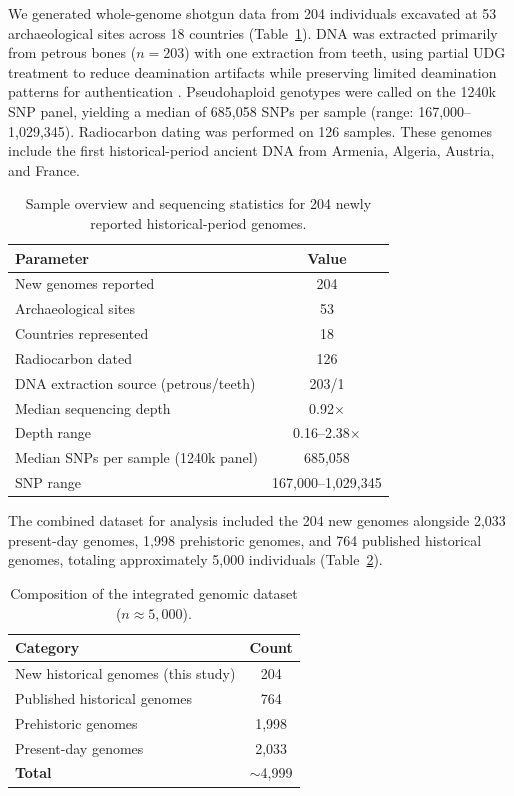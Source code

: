 \documentclass[11pt]{article}
\begin{document}
We generated whole-genome shotgun data from 204 individuals excavated at 53 archaeological sites across 18 countries (Table~\ref{tab:sample_overview}). DNA was extracted primarily from petrous bones ($n = 203$) with one extraction from teeth, using partial UDG treatment to reduce deamination artifacts while preserving limited deamination patterns for authentication \citep{rohland2015partial}. Pseudohaploid genotypes were called on the 1240k SNP panel, yielding a median of 685,058 SNPs per sample (range: 167,000--1,029,345). Radiocarbon dating was performed on 126 samples. These genomes include the first historical-period ancient DNA from Armenia, Algeria, Austria, and France.

\begin{table}[H]
\centering
\caption{Sample overview and sequencing statistics for 204 newly reported historical-period genomes.}
\label{tab:sample_overview}
\begin{tabular}{lc}
\toprule
\textbf{Parameter} & \textbf{Value} \\
\midrule
New genomes reported & 204 \\
Archaeological sites & 53 \\
Countries represented & 18 \\
Radiocarbon dated & 126 \\
DNA extraction source (petrous/teeth) & 203/1 \\
Median sequencing depth & 0.92$\times$ \\
Depth range & 0.16--2.38$\times$ \\
Median SNPs per sample (1240k panel) & 685,058 \\
SNP range & 167,000--1,029,345 \\
\bottomrule
\end{tabular}
\end{table}

The combined dataset for analysis included the 204 new genomes alongside 2,033 present-day genomes, 1,998 prehistoric genomes, and 764 published historical genomes, totaling approximately 5,000 individuals (Table~\ref{tab:dataset_composition}).

\begin{table}[H]
\centering
\caption{Composition of the integrated genomic dataset ($n \approx 5{,}000$).}
\label{tab:dataset_composition}
\begin{tabular}{lc}
\toprule
\textbf{Category} & \textbf{Count} \\
\midrule
New historical genomes (this study) & 204 \\
Published historical genomes & 764 \\
Prehistoric genomes & 1,998 \\
Present-day genomes & 2,033 \\
\midrule
\textbf{Total} & $\sim$4,999 \\
\bottomrule
\end{tabular}
\end{table}
\end{document}
